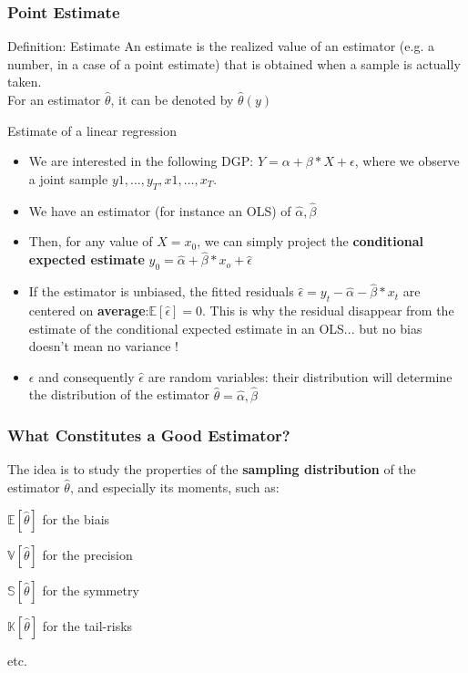 \documentclass{beamer}
\newenvironment{wideitemize}{\itemize\addtolength{\itemsep}{10pt}}{\enditemize}
\begin{document}
  \begin{frame}
    \frametitle{Point Estimate}
    \begin{block}{Definition: Estimate}
      An estimate is the realized value of an estimator (e.g. a number, in a case of a point estimate) that is obtained when a sample is actually taken.\\
      For an estimator $\hat{\theta}$, it can be denoted by $\hat{\theta}(y)$
    \end{block}

    \begin{exampleblock}{Estimate of a linear regression}
      \begin{itemize}
      \item We are interested in the following DGP: $Y = \alpha + \beta*X + \epsilon$, where we observe a joint sample ${y1, \dots, y_T}, {x1, \dots, x_T}$.\\
      \item We have an estimator (for instance an OLS) of $\hat{\alpha}, \hat{\beta}$
      \item Then, for any value of $X=x_0$, we can simply project the \textbf{conditional expected estimate} $y_0 = \hat{\alpha} + \hat{\beta}*x_o + \hat{\epsilon}$
      \item If the estimator is unbiased, the fitted residuals $\hat{\epsilon} = y_t - \hat{\alpha} - \hat{\beta}*x_t$ are centered on \textbf{average}:$\mathbb{E}\left[\hat{\epsilon}\right]=0$. This is why the residual disappear from the estimate of the conditional expected estimate in an OLS... but no bias doesn't mean no variance !
      \item $\epsilon$ and consequently $\hat{\epsilon}$ are random variables: their distribution will determine the distribution of the estimator $\hat{\theta} = \hat{\alpha}, \hat{\beta}$
      \end{itemize}
    \end{exampleblock}    
  \end{frame}


  \begin{frame}
    \frametitle{What Constitutes a Good Estimator?}
    The idea is to study the properties of the \textbf{sampling distribution} of the estimator $\hat{\theta}$, and especially its moments, such as:

    \begin{wideitemize}
    \item $\mathbb{E}[\hat{\theta}]$ for the biais
    \item $\mathbb{V}[\hat{\theta}]$ for the precision
    \item $\mathbb{S}[\hat{\theta}]$ for the symmetry
    \item $\mathbb{K}[\hat{\theta}]$ for the tail-risks  
    \item etc.
    \end{wideitemize}
  \end{frame}
\end{document}
